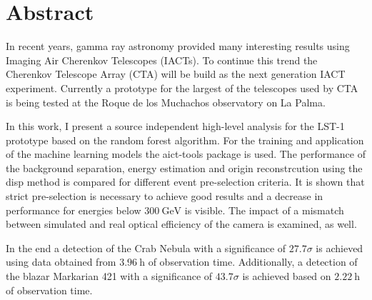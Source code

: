 \thispagestyle{plain}

\section*{Abstract}
In recent years, gamma ray astronomy provided many interesting results using Imaging Air Cherenkov Telescopes (IACTs).
To continue this trend the Cherenkov Telescope Array (CTA) will be build as the next generation IACT experiment.
Currently a prototype for the largest of the telescopes used by CTA is being tested at the Roque de los Muchachos observatory on La Palma.

In this work, I present a source independent high-level analysis for the LST-1 prototype based on the random forest algorithm.
For the training and application of the machine learning models the aict-tools package is used.
The performance of the background separation, energy estimation and origin reconstrcution using the disp method is compared for 
different event pre-selection criteria.
It is shown that strict pre-selection is necessary to achieve good results and a decrease in performance for energies below $\SI{300}{\giga\electronvolt}$
is visible.
The impact of a mismatch between simulated and real optical efficiency of the camera is examined, as well.

In the end a detection of the Crab Nebula with a significance of $\num{27.7} \sigma$ is achieved using data obtained from $\SI{3.96}{\hour}$ of observation time.
Additionally, a detection of the blazar Markarian 421 with a significance of $\num{43.7} \sigma$ is achieved based on $\SI{2.22}{\hour}$ of observation time.
